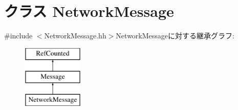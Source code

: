 \hypertarget{classNetworkMessage}{
\section{クラス NetworkMessage}
\label{classNetworkMessage}
}


{\ttfamily \#include $<$NetworkMessage.hh$>$}NetworkMessageに対する継承グラフ:\begin{figure}[H]
\begin{center}
\leavevmode
\includegraphics[height=3cm]{classNetworkMessage}
\end{center}
\end{figure}
